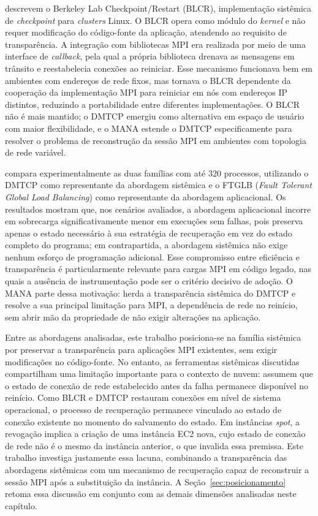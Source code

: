  descrevem o Berkeley Lab Checkpoint/Restart
(BLCR), implementação sistêmica de \textit{checkpoint} para \textit{clusters} Linux.
O BLCR opera como módulo do \textit{kernel} e não requer modificação do
código-fonte da aplicação, atendendo ao requisito de transparência. A
integração com bibliotecas MPI era realizada por meio de uma interface de
\textit{callback}, pela qual a própria biblioteca drenava as mensagens em
trânsito e reestabelecia conexões ao reiniciar. Esse mecanismo funcionava bem
em ambientes com endereços de rede fixos, mas tornava o BLCR dependente da
cooperação da implementação MPI para reiniciar em nós com endereços IP
distintos, reduzindo a portabilidade entre diferentes implementações. O BLCR
não é mais mantido; o DMTCP emergiu como alternativa em espaço de usuário com
maior flexibilidade, e o MANA estende o DMTCP especificamente para resolver
o problema de reconstrução da sessão MPI em ambientes com topologia de rede
variável.

 compara experimentalmente as duas famílias com
até 320 processos, utilizando o DMTCP como representante da abordagem sistêmica
e o FTGLB (\textit{Fault Tolerant Global Load Balancing}) como representante da
abordagem aplicacional. Os resultados mostram
que, nos cenários avaliados, a abordagem aplicacional incorre em sobrecarga
significativamente menor em execuções sem falhas, pois preserva apenas o estado
necessário à sua estratégia de recuperação em vez do estado completo do
programa; em contrapartida, a abordagem sistêmica não exige nenhum esforço de
programação adicional. Esse compromisso entre eficiência e transparência é
particularmente relevante para cargas MPI em código legado, nas quais a
ausência de instrumentação pode ser o critério decisivo de adoção. O MANA parte
dessa motivação: herda a transparência sistêmica do DMTCP e resolve a sua
principal limitação para MPI, a dependência de rede no reinício, sem abrir
mão da propriedade de não exigir alterações na aplicação.

Entre as abordagens analisadas, este trabalho posiciona-se na família sistêmica
por preservar a transparência para aplicações MPI existentes, sem exigir modificações
no código-fonte. No entanto, as ferramentas sistêmicas discutidas compartilham
uma limitação importante para o contexto de nuvem: assumem que o estado de conexão
de rede estabelecido antes da falha permanece disponível no reinício.
Como BLCR e DMTCP restauram conexões em nível de sistema operacional, o processo
de recuperação permanece vinculado ao estado de conexão existente no momento do
salvamento do estado. Em instâncias \textit{spot}, a revogação implica a criação de
uma instância EC2 nova, cujo estado de conexão de rede não é o mesmo da instância
anterior, o que invalida essa premissa. Este trabalho investiga justamente essa
lacuna, combinando a transparência das abordagens sistêmicas com um mecanismo de
recuperação capaz de reconstruir a sessão MPI após a substituição da instância. A
Seção~\ref{sec:posicionamento} retoma essa discussão em conjunto com as demais
dimensões analisadas neste capítulo.

